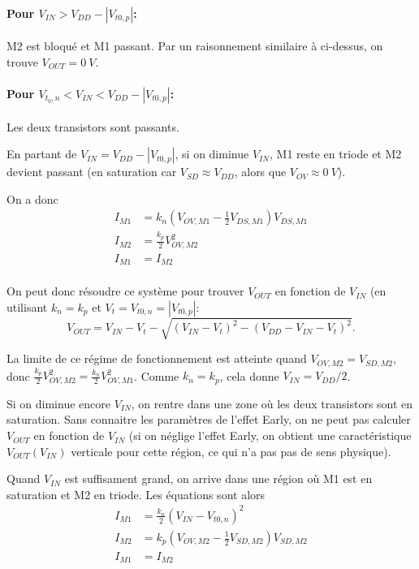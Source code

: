 \documentclass[frenchb,DIV=14]{scrartcl}
\begin{document}
\paragraph{Pour $V_{IN} > V_{DD} - \left|V_{t0,p}\right|$:}
M2 est bloqué et M1 passant. Par un raisonnement similaire à ci-dessus,
on trouve $V_{OUT} = \SI{0}{V}$.

\paragraph{Pour $V_{t_0,n} < V_{IN} < V_{DD} - \left|V_{t0,p}\right|$:}
Les deux transistors sont passants.

En partant de $V_{IN} = V_{DD} - \left|V_{t0,p}\right|$,
si on diminue $V_{IN}$, M1 reste en triode et M2 devient passant
(en saturation car $V_{SD} \approx V_{DD}$, alors que $V_{OV} \approx \SI{0}{V}$).

On a donc
\begin{align*}
    I_{M1} &= k_n \left(V_{OV,M1}-\frac{1}{2}V_{DS,M1}\right)V_{DS,M1} \\
    I_{M2} &= \frac{k_p}{2} V_{OV,M2}^2 \\
    I_{M1} &= I_{M2} \\
\end{align*}

On peut donc résoudre ce système pour trouver $V_{OUT}$ en fonction
de $V_{IN}$ (en utilisant $k_n = k_p$ et $V_t = V_{t0,n} = |V_{t0,p}|$:
\[V_{OUT} = V_{IN}-V_t - \sqrt{(V_{IN}-V_t)^2-(V_{DD}-V_{IN}-V_t)^2}.\]

La limite de ce régime de fonctionnement est atteinte quand
$V_{OV,M2} = V_{SD,M2}$, donc $\frac{k_p}{2}V_{OV,M2}^2 = \frac{k_n}{2}V_{OV,M1}^2$.
Comme $k_n = k_p$, cela donne $V_{IN} = V_{DD}/2$.

Si on diminue encore $V_{IN}$, on rentre dans une zone où les deux transistors sont en saturation.
Sans connaitre les paramètres de l'effet Early, on ne peut pas calculer
$V_{OUT}$ en fonction de $V_{IN}$ (si on néglige l'effet Early, on
obtient une caractéristique $V_{OUT}(V_{IN})$ verticale pour cette région,
ce qui n'a pas pas de sens physique).

Quand $V_{IN}$ est suffisament grand, on arrive dans une région où
M1 est en saturation et M2 en triode.
Les équations sont alors
\begin{align*}
    I_{M1} &= \frac{k_n}{2} (V_{IN} - V_{t0,n})^2 \\
    I_{M2} &= k_p \left(V_{OV,M2}-\frac{1}{2}V_{SD,M2}\right)V_{SD,M2} \\
    I_{M1} &= I_{M2} \\
\end{align*}
\end{document}
